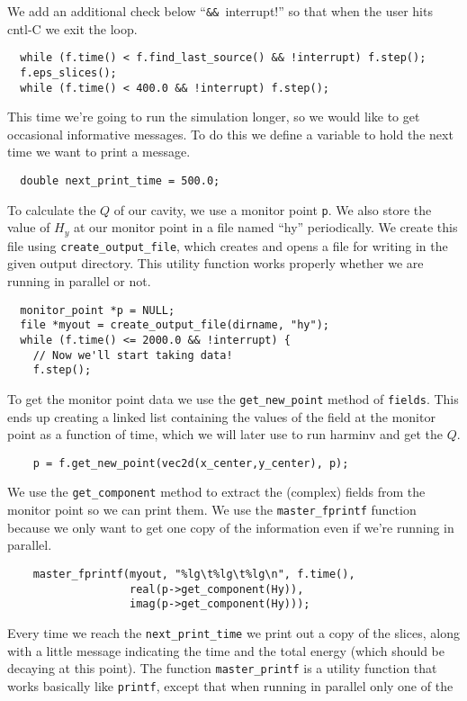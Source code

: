 We add an additional check below ``\verb!&& !interrupt!'' so that when the
user hits cntl-C we exit the loop.
\begin{verbatim}
  while (f.time() < f.find_last_source() && !interrupt) f.step();
  f.eps_slices();
  while (f.time() < 400.0 && !interrupt) f.step();
\end{verbatim}
This time we're going to run the simulation longer, so we would like to get
occasional informative messages.  To do this we define a variable to hold
the next time we want to print a message.
\begin{verbatim}
  double next_print_time = 500.0;
\end{verbatim}
To calculate the $Q$ of our cavity, we use a monitor point \verb!p!.  We
also store the value of $H_y$ at our monitor point in a file named ``hy''
periodically.  We create this file using \verb!create_output_file!, which
creates and opens a file for writing in the given output directory.  This
utility function works properly whether we are running in parallel or not.
\begin{verbatim}
  monitor_point *p = NULL;
  file *myout = create_output_file(dirname, "hy");
  while (f.time() <= 2000.0 && !interrupt) {
    // Now we'll start taking data!
    f.step();
\end{verbatim}
To get the monitor point data we use the \verb!get_new_point! method of
\verb!fields!.  This ends up creating a linked list containing the values
of the field at the monitor point as a function of time, which we will
later use to run harminv and get the $Q$.
\begin{verbatim}
    p = f.get_new_point(vec2d(x_center,y_center), p);
\end{verbatim}
We use the \verb!get_component! method to extract the (complex) fields from
the monitor point so we can print them.  We use the \verb!master_fprintf!
function because we only want to get one copy of the information even if
we're running in parallel.
\begin{verbatim}
    master_fprintf(myout, "%lg\t%lg\t%lg\n", f.time(),
                   real(p->get_component(Hy)),
                   imag(p->get_component(Hy)));
\end{verbatim}
Every time we reach the \verb!next_print_time! we print out a copy of the
slices, along with a little message indicating the time and the total
energy (which should be decaying at this point).  The function
\verb!master_printf! is a utility function that works basically like
\verb!printf!, except that when running in parallel only one of the
